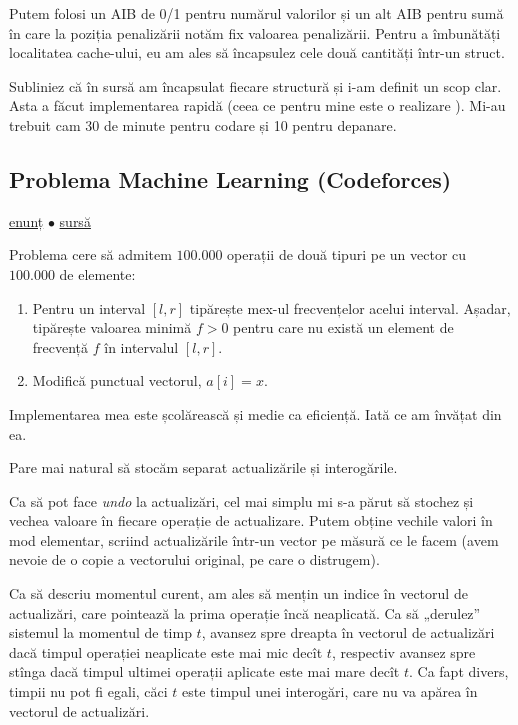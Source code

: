 Putem folosi un AIB de 0/1 pentru numărul valorilor și un alt AIB pentru sumă în care la poziția penalizării notăm fix valoarea penalizării. Pentru a îmbunătăți localitatea cache-ului, eu am ales să încapsulez cele două cantități într-un struct.

Subliniez că în sursă am încapsulat fiecare structură și i-am definit un scop clar. Asta a făcut implementarea rapidă (ceea ce pentru mine este o realizare ). Mi-au trebuit cam 30 de minute pentru codare și 10 pentru depanare.

\subsection{Problema Machine Learning (Codeforces)}
\label{problem:machine-learning}

\href{https://codeforces.com/contest/940/problem/F}{enunț}
$\bullet$
\hyperref[code:machine-learning]{sursă}

Problema cere să admitem $100.000$ operații de două tipuri pe un vector cu $100.000$ de elemente:

\begin{enumerate}
  \item Pentru un interval $[l,r]$ tipărește mex-ul frecvențelor acelui interval. Așadar, tipărește valoarea minimă $f > 0$ pentru care nu există un element de frecvență $f$ în intervalul $[l,r]$.
  \item Modifică punctual vectorul, $a[i] = x$.
\end{enumerate}

Implementarea mea este școlărească și medie ca eficiență. Iată ce am învățat din ea.

Pare mai natural să stocăm separat actualizările și interogările.

Ca să pot face \textit{undo} la actualizări, cel mai simplu mi s-a părut să stochez și vechea valoare în fiecare operație de actualizare. Putem obține vechile valori în mod elementar, scriind actualizările într-un vector pe măsură ce le facem (avem nevoie de o copie a vectorului original, pe care o distrugem).

Ca să descriu  momentul curent, am ales să mențin un indice în vectorul de actualizări, care pointează la prima operație încă neaplicată. Ca să „derulez” sistemul la momentul de timp $t$, avansez spre dreapta în vectorul de actualizări dacă timpul operației neaplicate este mai mic decît $t$, respectiv avansez spre stînga dacă timpul ultimei operații aplicate este mai mare decît $t$. Ca fapt divers, timpii nu pot fi egali, căci $t$ este timpul unei interogări, care nu va apărea în vectorul de actualizări.

